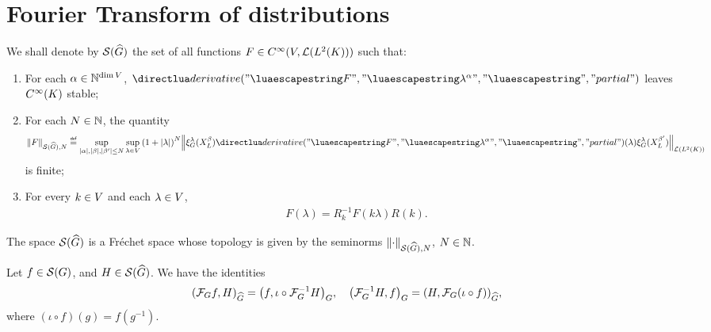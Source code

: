 \section{Fourier Transform of distributions}

\begin{definition}
    We shall denote by $\Schwartz{\dualGroup\Group}$
    the set of all functions $F \in \SmoothFunctions{\VectorSpace, \Lin{\Lebesgue{2}\CompactGroup}}$ such that:
    \begin{enumerate}
        \item For each $\alpha \in \N^{\dim \VectorSpace}$,
            $\D[F]{\lambda^\alpha}$ leaves $\SmoothFunctions\CompactGroup$ stable;
        \item For each $N \in \N$, the quantity
            \begin{align*}
                \seminorm[\Schwartz{\dualGroup\Group}]{N}{F} \defeq
                \sup_{\abs\alpha, \abs\beta, \abs{\beta'} \leq N}
                \sup_{\lambda \in \VectorSpace}
                {(1 + \abs\lambda)}^N
                \norm[\Lin{\Lebesgue{2}\CompactGroup}]{%
                    \Rep\lambda(\LeftDifferentialOperator\beta)
                    \D[F]{\lambda^\alpha}(\lambda)
                    \Rep\lambda(\LeftDifferentialOperator{\beta'})
                }
            \end{align*}
            is finite;
        \item For every $k \in \VectorSpace$ and each $\lambda \in \VectorSpace$,
            \begin{align*}
                F(\lambda) = R_k^{-1} F(k \lambda) R(k).
            \end{align*}
    \end{enumerate}
\end{definition}

\begin{lemma}
    The space $\Schwartz{\dualGroup\Group}$ is a Fr\'echet space
    whose topology is given by the seminorms $\seminorm[\Schwartz{\dualGroup\Group}]{N}{\dummy}$, $N \in \N$.
\end{lemma}

\begin{proposition}
    Let $f \in \Schwartz\Group$, and $H \in \Schwartz{\dualGroup\Group}$.
    We have the identities
    \begin{align*}
        \ip[\dualGroup\Group]{\Fourier f}{H}
        = \ip[\Group]{f}{\iota \circ \InverseFourier H},\quad
        \ip[\Group]{\InverseFourier H}{f}
        = \ip[\dualGroup\Group]{H}{\Fourier (\iota \circ f)},
    \end{align*}
    where $(\iota \circ f)(g) = f(g^{-1})$.
\end{proposition}


